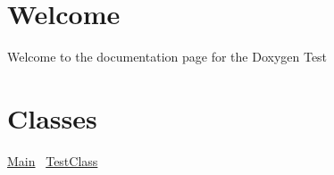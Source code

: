 \hypertarget{index_first_section}{}\section{Welcome}\label{index_first_section}
Welcome to the documentation page for the Doxygen Test\hypertarget{index_classes}{}\section{Classes}\label{index_classes}
\hyperlink{classdoxygendemo_1_1_main}{Main}~\newline
\hyperlink{classdoxygendemo_1_1_test_class}{Test\+Class} 